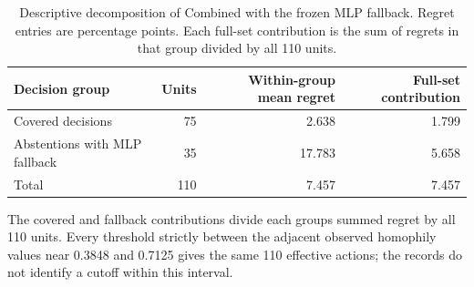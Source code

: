 \begin{table}[t]
\centering
\caption{Descriptive decomposition of Combined with the frozen MLP fallback. Regret entries are percentage points. Each full-set contribution is the sum of regrets in that group divided by all 110 units.}
\label{tab:fallback_decomposition}
\small
\setlength{\tabcolsep}{3.5pt}
\begin{tabular}{@{}lrrr@{}}
\toprule
Decision group & Units & Within-group mean regret & Full-set contribution \\
\midrule
Covered decisions & 75 & 2.638 & 1.799 \\
Abstentions with MLP fallback & 35 & 17.783 & 5.658 \\
\midrule
Total & 110 & 7.457 & 7.457 \\
\bottomrule
\end{tabular}
\end{table}
The covered and fallback contributions divide each group\textquotesingle s summed regret by all 110 units. Every threshold strictly between the adjacent observed homophily values near 0.3848 and 0.7125 gives the same 110 effective actions; the records do not identify a cutoff within this interval.
